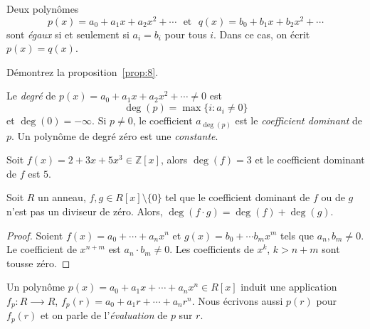 \begin{proposition}
  \label{prop:8}
  Deux polynômes 
\begin{equation}
  \label{eq:34}
  p(x) = a_0 + a_1x + a_2x^2 + \cdots \,\,\text{ et }  \,\, q(x) = b_0 + b_1x + b_2x^2 + \cdots
\end{equation}
sont \emph{égaux} si et seulement si $a_i =b_i$ pour tous $i$. Dans ce
cas, on écrit $p(x) = q(x)$.
\end{proposition}

\begin{exercise}
  \label{exe:34}
  Démontrez  la proposition~\ref{prop:8}. 
\end{exercise}



\begin{definition}
  \label{def:52}
Le \emph{degré} de $p(x) = a_0 + a_1x + a_2x^2 + \cdots \neq 0$ est 
\begin{displaymath}
  \deg(p) = \max\{i \colon  a_i \neq 0\}
\end{displaymath}
et $\deg(0) = -\infty$. 
Si $p \neq 0$, le coefficient $a_{\deg(p)}$ est le \emph{coefficient dominant} de $p$. 
Un polynôme de degré zéro est une \emph{constante}.
\end{definition}

\begin{example}
  \label{exe:35}
  Soit $f(x) = 2 + 3x + 5x^3 ∈ ℤ[x]$, alors $\deg(f) =3$  et le coefficient dominant de $f$ est $5$. 
\end{example}

\begin{theorem}
  \label{thr:34} Soit $R$ un anneau,   $f,g \in R[x] \setminus \{0\}$ tel que le coefficient dominant de $f$ ou de $g$ n'est pas un diviseur de zéro.  Alors, $\deg(f \cdot g) = \deg(f) + \deg(g)$. 
\end{theorem}
\begin{proof}
  
  Soient $f(x) = a_0 + \cdots + a_n x^n$ et $g(x) = b_0+ \cdots b_m x^m$ tels que $a_n, b_m  \neq 0$. Le coefficient de $x^{n+m}$  est $a_n \cdot  b_m \neq 0$. Les coefficients de $x^k$, $k> n+m$ sont tousse zéro.  
\end{proof}

Un polynôme $p(x) = a_0 + a_1 x + \cdots + a_n x^n ∈ R[x]$ induit une application $f_p:  R ⟶ R$, $f_p(r) = a_0+ a_1 r+ \cdots + a_n r^n$. Nous écrivons aussi $p(r)$ pour $f_p(r)$ et on parle de l'\emph{évaluation} de $p$ sur $r$. 


